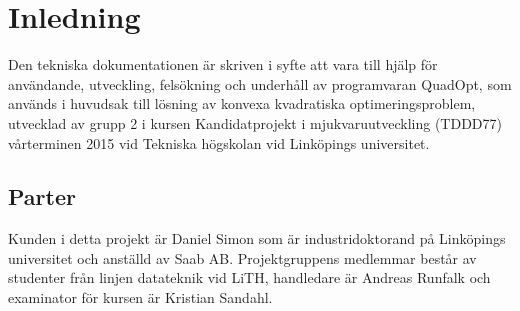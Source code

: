 \section{Inledning}
Den tekniska dokumentationen är skriven i syfte att vara till hjälp för användande, utveckling, felsökning och underhåll av programvaran QuadOpt, som används i huvudsak till lösning av konvexa kvadratiska optimeringsproblem, utvecklad av grupp 2 i kursen Kandidatprojekt i mjukvaruutveckling (TDDD77) vårterminen 2015 vid Tekniska högskolan vid Linköpings universitet.

\subsection{Parter}
Kunden i detta projekt är Daniel Simon som är industridoktorand på Linköpings universitet och anställd av Saab AB. Projektgruppens medlemmar består av studenter från linjen datateknik vid LiTH, handledare är Andreas Runfalk och examinator för kursen är Kristian Sandahl.





